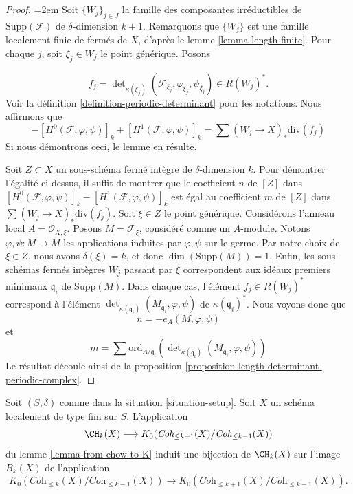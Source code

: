\begin{proof}
{\emergencystretch=2em Soit $\{W_j\}_{j \in J}$ la famille des composantes irréductibles
de $\text{Supp}(\mathcal{F})$
de $\delta$-dimension $k + 1$. Remarquons que $\{W_j\}$
est une famille localement finie de fermés de
$X$, d'après le lemme \ref{lemma-length-finite}.
Pour chaque $j$, soit $\xi_j \in W_j$ le point générique.
Posons\par}
$$
f_j = \det\nolimits_{\kappa(\xi_j)}
(\mathcal{F}_{\xi_j}, \varphi_{\xi_j}, \psi_{\xi_j})
\in
R(W_j)^*.
$$
Voir la définition \ref{definition-periodic-determinant} pour les notations.
Nous affirmons que
$$
- [H^0(\mathcal{F}, \varphi, \psi)]_k + [H^1(\mathcal{F}, \varphi, \psi)]_k
=
\sum (W_j \to X)_*\text{div}(f_j)
$$
Si nous démontrons ceci, le lemme en résulte.

\medskip\noindent
Soit $Z \subset X$ un sous-schéma fermé intègre de $\delta$-dimension $k$.
Pour démontrer l'égalité ci-dessus, il suffit de montrer que le coefficient $n$
de $[Z]$ dans
$
[H^0(\mathcal{F}, \varphi, \psi)]_k - [H^1(\mathcal{F}, \varphi, \psi)]_k
$
est égal au coefficient $m$ de $[Z]$ dans
$
\sum (W_j \to X)_*\text{div}(f_j)
$.
Soit $\xi \in Z$ le point générique.
Considérons l'anneau local $A = \mathcal{O}_{X, \xi}$.
Posons $M = \mathcal{F}_\xi$, considéré comme un $A$-module.
Notons $\varphi, \psi : M \to M$ les applications induites par $\varphi, \psi$ sur
le germe.
Par notre choix de $\xi \in Z$, nous avons $\delta(\xi) = k$,
et donc $\dim(\text{Supp}(M)) = 1$.
Enfin, les sous-schémas fermés intègres
$W_j$ passant par $\xi$ correspondent aux idéaux premiers minimaux
$\mathfrak q_i$ de $\text{Supp}(M)$.
Dans chaque cas, l'élément $f_j \in R(W_j)^*$ correspond à
l'élément $\det_{\kappa(\mathfrak q_i)}(M_{\mathfrak q_i}, \varphi, \psi)$
de $\kappa(\mathfrak q_i)^*$. Nous voyons donc que
$$
n = - e_A(M, \varphi, \psi)
$$
et
$$
m =
\sum
\text{ord}_{A/\mathfrak q_i}
(\det\nolimits_{\kappa(\mathfrak q_i)}(M_{\mathfrak q_i}, \varphi, \psi))
$$
Le résultat découle ainsi de la
proposition \ref{proposition-length-determinant-periodic-complex}.
\end{proof}

\begin{lemma}
\label{lemma-cycles-rational-equivalence-K-group}
Soit $(S, \delta)$ comme dans la situation \ref{situation-setup}.
Soit $X$ un schéma localement de type fini sur $S$.
L'application
$$
\CH_k(X) \longrightarrow
K_0(\textit{Coh}_{\leq k + 1}(X)/\textit{Coh}_{\leq k - 1}(X))
$$
du lemme \ref{lemma-from-chow-to-K} induit une bijection de
$\CH_k(X)$ sur l'image $B_k(X)$ de l'application
$$
K_0(\textit{Coh}_{\leq k}(X)/\textit{Coh}_{\leq k - 1}(X))
\longrightarrow
K_0(\textit{Coh}_{\leq k + 1}(X)/\textit{Coh}_{\leq k - 1}(X)).
$$
\end{lemma}

